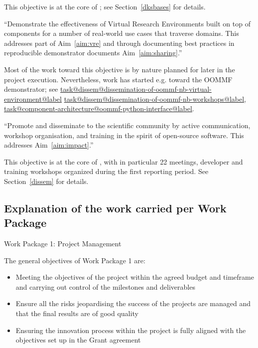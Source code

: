 \documentclass{deliverablereport}
\makeatletter
\renewcommand\subsubsection{\@startsection{subsubsection}{2}%
  \z@{.5\linespacing\@plus.7\linespacing}{.1\linespacing}%
  {\normalfont\bfseries}}
\newcommand\localtaskref[2]{\hyperref[#1@#2]{\csname task@#1@#2@label\endcsname}}
\makeatother
\begin{document}
\begin{compactenum}
  This objective is at the core of ; see
  Section~\ref{dksbases} for details. 


\item \label{objective:demo} ``Demonstrate the effectiveness of Virtual
  Research Environments built on top of \ODK components for a
  number of real-world use cases that traverse domains. This addresses
  part of Aim~\ref{aim:vre} and through documenting best practices in
  reproducible demonstrator documents Aim~\ref{aim:sharing}.''

  Most of the work toward this objective is by nature planned for
  later in the project execution. Nevertheless, work has started e.g.
  toward the OOMMF demonstrator; see
  \localtaskref{dissem}{dissemination-of-oommf-nb-virtual-environment}
  \localtaskref{dissem}{dissemination-of-oommf-nb-workshops},
  \localtaskref{component-architecture}{oommf-python-interface}.

\item \label{objective:disseminate} ``Promote and disseminate
  \ODK to the scientific community by active communication,
  workshop organisation, and training in the spirit of open-source
  software. This addresses Aim~\ref{aim:impact}.''

  This objective is at the core of , with in particular
  22 meetings, developer and training workshops organized during the
  first reporting period. See Section~\ref{dissem} for details.
\end{compactenum}

\subsection{Explanation of the work carried per Work Package}
\subsubsection{Work Package 1: Project Management}


The general objectives of Work Package 1 are:

\begin{itemize}
\item{Meeting the objectives of the project within the agreed budget and timeframe and carrying out control of the milestones and deliverables}
\item{Ensure all the risks jeopardising the success of the projects are managed and that the final results are of good quality}
\item{Ensuring the innovation process within the project is fully aligned with the objectives set up in the Grant agreement}
\end{itemize}
\end{document}
